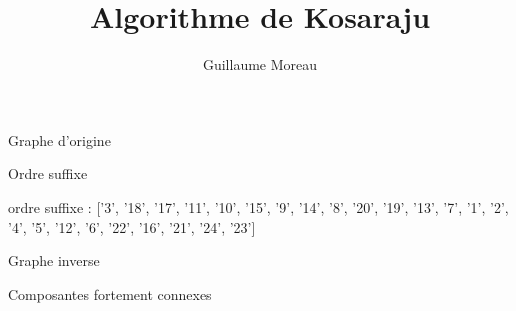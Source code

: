 \documentclass[xcolor=dvipsnames]{beamer}
\title{Algorithme de Kosaraju}
\author{Guillaume Moreau}
\begin{document}
    \maketitle


    

    \begin{frame}{Graphe d'origine}

        \begin{center}
                  
        \end{center}
    
    
    \end{frame}
    

\begin{frame}{Ordre suffixe}

    \begin{center}
              
    \end{center}
    ordre suffixe : ['3', '18', '17', '11', '10', '15', '9', '14', '8', '20', '19', '13', '7', '1', '2', '4', '5', '12', '6', '22', '16', '21', '24', '23']


\end{frame}

\begin{frame}{Graphe inverse}

    \begin{center}
              
    \end{center}


\end{frame}


\begin{frame}{Composantes fortement connexes}

    \begin{center}
              
    \end{center}


\end{frame}
\end{document}
